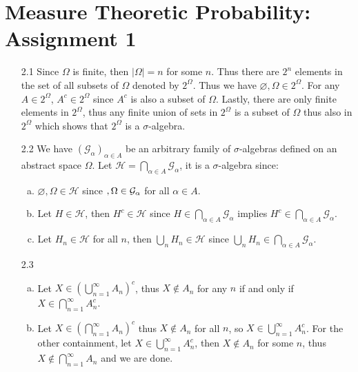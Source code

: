 \documentclass[a4paper,10pt]{article}
\theoremstyle{definition}
\begin{document}
\section*{Measure Theoretic Probability: Assignment 1}

\begin{enumerate}
\item[2.1] Since $\Omega$ is finite, then $|\Omega| = n$ for some $n$. Thus there are $2^n$ elements in the set of all subsets of $\Omega$ denoted by $2^\Omega$. Thus we have $\varnothing, \Omega \in 2^\Omega$. For any $A \in 2^\Omega$, $A^c \in 2^\Omega$ since $A^c$ is also a subset of $\Omega$. Lastly, there are only finite elements in $2^\Omega$, thus any finite union of sets in $2^\Omega$ is a subset of $\Omega$ thus also in $2^\Omega$ which shows that $2^\Omega$ is a $\sigma$-algebra.

\item[2.2] We have $(\mathcal{G}_\alpha)_{\alpha\in A}$ be an arbitrary family of $\sigma$-algebras defined on an abstract space $\Omega$. Let $\mathcal{H} = \bigcap_{\alpha \in A}\mathcal{G}_\alpha$, it is a $\sigma$-algebra since:
\begin{enumerate}[(a)]
\item $\varnothing, \Omega \in \mathcal{H}$ since $\empty, \Omega \in \mathcal{G}_\alpha$ for all $\alpha \in A$.
\item Let $H \in \mathcal{H}$, then $H^c \in \mathcal{H}$ since $H \in \bigcap_{\alpha \in A}\mathcal{G}_\alpha$ implies $H^c \in \bigcap_{\alpha \in A}\mathcal{G}_\alpha$.
\item Let $H_n \in \mathcal{H}$ for all $n$, then $\bigcup_{n}H_n \in \mathcal{H}$ since $\bigcup_{n}H_n \in \bigcap_{\alpha \in A}\mathcal{G}_\alpha$.
\end{enumerate}

\item[2.3]
\begin{enumerate}[a)]
\item Let $X \in \left(\bigcup_{n=1}^{\infty}A_n\right)^c$, thus $X \notin A_n$ for any $n$ if and only if  $X \in \bigcap_{n=1}^{\infty}A^c_n$. 
\item Let $X \in (\bigcap_{n=1}^{\infty}A_n)^c$ thus $X \notin A_n$ for all $n$, so $X \in \bigcup_{n=1}^{\infty}A_n^c$. For the other containment, let $X \in \bigcup_{n=1}^{\infty}A_n^c$, then $X \notin A_n$ for some $n$, thus $X \notin \bigcap_{n=1}^{\infty}A_n$ and we are done.
\end{enumerate}


\end{enumerate}
\end{document}
